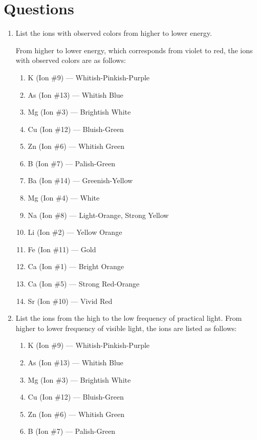 \documentclass[11pt]{article}
\begin{document}
\section*{Questions}
\begin{enumerate}
    \item List the ions with observed colors from higher to lower energy.


From higher to lower energy, which corresponds from violet to red, the ions with observed colors are as follows:
    \begin{enumerate}
        \item K (Ion \#9) --- Whitish-Pinkish-Purple
        \item As (Ion \#13) --- Whitish Blue
        \item Mg (Ion \#3) --- Brightish White
        \item Cu (Ion \#12) --- Bluish-Green
        \item Zn (Ion \#6) --- Whitish Green
        \item B (Ion \#7) --- Palish-Green
        \item Ba (Ion \#14) --- Greenish-Yellow
        \item Mg (Ion \#4) --- White
        \item Na (Ion \#8) --- Light-Orange, Strong Yellow
        \item Li (Ion \#2) --- Yellow Orange
        \item Fe (Ion \#11) --- Gold
        \item Ca (Ion \#1) --- Bright Orange
        \item Ca (Ion \#5) --- Strong Red-Orange
        \item Sr (Ion \#10) --- Vivid Red
    \end{enumerate}
    \item List the ions from the high to the low frequency of practical light.
From higher to lower frequency of visible light, the ions are listed as follows:
    \begin{enumerate}
        \item K (Ion \#9) --- Whitish-Pinkish-Purple
        \item As (Ion \#13) --- Whitish Blue
        \item Mg (Ion \#3) --- Brightish White
        \item Cu (Ion \#12) --- Bluish-Green
        \item Zn (Ion \#6) --- Whitish Green
        \item B (Ion \#7) --- Palish-Green

\end{enumerate}
\end{enumerate}
\end{document}
